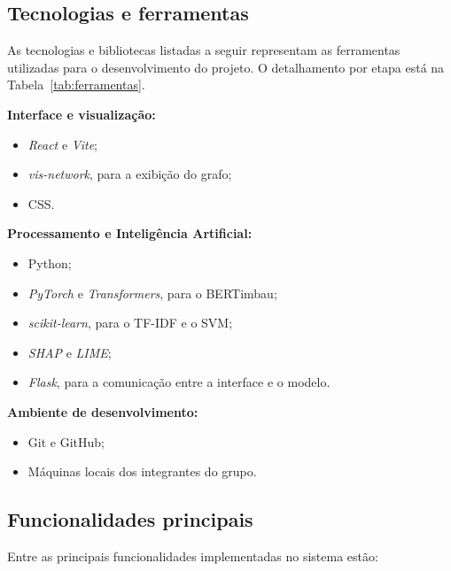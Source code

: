 \documentclass[
    12pt,                %
    openright,           %
    oneside,             %
    a4paper,             %
    english,             %
    brazil               %
]{abntex2}
\begin{document}
\subsection{Tecnologias e ferramentas}

As tecnologias e bibliotecas listadas a seguir representam as ferramentas 
utilizadas para o desenvolvimento do projeto. O detalhamento por etapa 
está na Tabela~\ref{tab:ferramentas}.

\textbf{Interface e visualização:}

\begin{itemize}
    \item \textit{React} e \textit{Vite};
    \item \textit{vis-network}, para a exibição do grafo;
    \item CSS.
\end{itemize}

\textbf{Processamento e Inteligência Artificial:}

\begin{itemize}
    \item Python;
    \item \textit{PyTorch} e \textit{Transformers}, para o BERTimbau;
    \item \textit{scikit-learn}, para o TF-IDF e o SVM;
    \item \textit{SHAP} e \textit{LIME};
    \item \textit{Flask}, para a comunicação entre a interface e o modelo.
\end{itemize}

\textbf{Ambiente de desenvolvimento:}

\begin{itemize}
    \item Git e GitHub;
    \item Máquinas locais dos integrantes do grupo.
\end{itemize}

\subsection{Funcionalidades principais}

Entre as principais funcionalidades implementadas no sistema estão:
\end{document}
